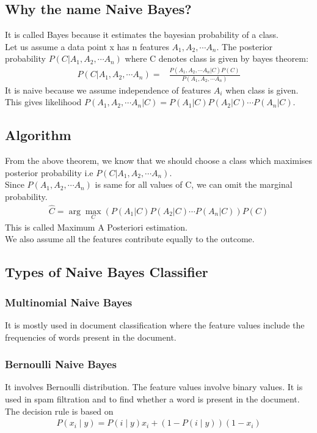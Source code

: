 \documentclass[12pt,letterpaper, onecolumn]{exam}
\begin{document}
\subsection*{Why the name Naive Bayes?}
It is called Bayes because it estimates the bayesian probability of a class.\\
Let us assume a data point x has n features $A_1, A_2,\cdots A_n$. The posterior probability $P(C|A_1, A_2,\cdots A_n)$ where C denotes class is given by bayes theorem:
\begin{align}
P(C|A_1, A_2,\cdots A_n) = {}& \frac{P(A_1, A_2,\cdots A_n |C) P(C)}{P(A_1, A_2,\cdots A_n)}
\end{align}
It is naive because we assume independence of features $A_i$ when class is given.\\
This gives likelihood $P(A_1, A_2,\cdots A_n |C) = P(A_1|C) P(A_2|C) \cdots P(A_n|C)$.

\subsection*{Algorithm}
From the above theorem, we know that we should choose a class which maximises posterior probability i.e $P(C|A_1, A_2,\cdots A_n)$. \\
Since $P(A_1, A_2,\cdots A_n)$ is same for all values of C, we can omit the marginal probability.
\begin{align}
\hat{C} = \arg \max_{C} (P(A_1|C) P(A_2|C) \cdots P(A_n|C))P(C)
\end{align}
This is called Maximum A Posteriori estimation.\\
We also assume all the features contribute equally to the outcome.
\subsection*{Types of Naive Bayes Classifier}
\subsubsection*{Multinomial Naive Bayes}
It is mostly used in document classification where the feature values include the frequencies of words present in the document.
\subsubsection*{Bernoulli Naive Bayes}
It involves Bernoulli distribution. The feature values involve binary values. It is used in spam filtration and to find whether a word is present in the document.\\ The decision rule is based on
\begin{align}
P(x_i \mid y) = P(i \mid y) x_i + (1 - P(i \mid y)) (1 - x_i)
\end{align}
\end{document}
